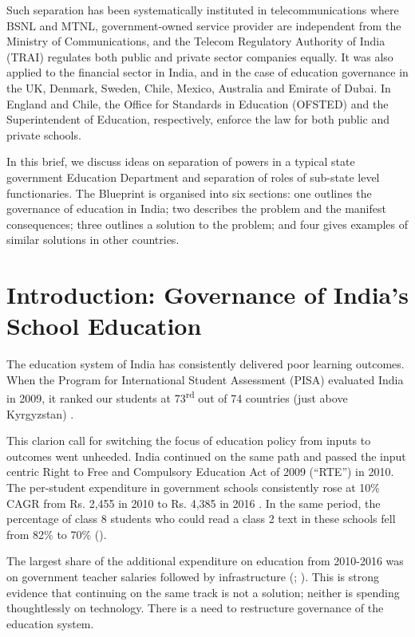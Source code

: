 \documentclass[a4paper, 12pt, twoside]{article}
\begin{document}
Such separation has been systematically instituted in telecommunications where BSNL and MTNL, government-owned service provider are independent from the Ministry of Communications, and the Telecom Regulatory Authority of India (TRAI) regulates both public and private sector companies equally. It was also applied to the financial sector in India, and in the case of education governance in the UK, Denmark, Sweden, Chile, Mexico, Australia and Emirate of Dubai. In England and Chile, the Office for Standards in Education (OFSTED) and the Superintendent of Education, respectively, enforce the law for both public and private schools. 

In this brief, we discuss ideas on separation of powers in a typical state government Education Department and separation of roles of sub-state level functionaries. The Blueprint is organised into six sections: one outlines the governance of education in India; two describes the problem and the manifest consequences; three outlines a solution to the problem; and four gives examples of similar solutions in other countries.

          

\newpage
\section*{Introduction: Governance of India's School Education}
                    
The education system of India has consistently delivered poor learning outcomes. When the Program for International Student Assessment (PISA) evaluated India in 2009, it ranked our students at 73\textsuperscript{rd} out of 74 countries (just above Kyrgyzstan) \parencite{pisa2009}. 

This clarion call for switching the focus of education policy from inputs to outcomes went unheeded. India continued on the same path and passed the input centric Right to Free and Compulsory Education Act of 2009 (“RTE”) in 2010. The per-student expenditure in government schools consistently rose at 10\% CAGR from Rs. 2,455 in 2010 to Rs. 4,385 in 2016 \parencite{ai1819}. In the same period, the percentage of class 8 students who could read a class 2 text in these schools fell from 82\% to 70\% (\cite{aser2016}). 

The largest share of the additional expenditure on education from 2010-2016 was on government teacher salaries followed by infrastructure (\cite{aibb2013-14}; \cite{cprbb2017-18}). This is strong evidence that continuing on the same track is not a solution; neither is spending thoughtlessly on technology. There is a need to restructure governance of the education system. 
\end{document}
